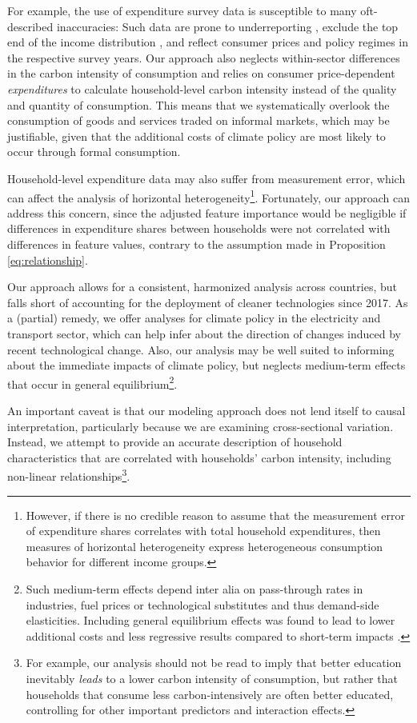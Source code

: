 \documentclass[12pt, a4paper]{article}
\begin{document}
For example, the use of expenditure survey data is susceptible to many oft-described inaccuracies: Such data are prone to underreporting \autocite{Meyer.2015}, exclude the top end of the income distribution \autocite{Blanchet.2022}, and reflect consumer prices and policy regimes in the respective survey years. Our approach also neglects within-sector differences in the carbon intensity of consumption and relies on consumer price-dependent \textit{expenditures} to calculate household-level carbon intensity instead of the quality and quantity of consumption. This means that we systematically overlook the consumption of goods and services traded on informal markets, which may be justifiable, given that the additional costs of climate policy are most likely to occur through formal consumption.

Household-level expenditure data may also suffer from measurement error, which can affect the analysis of horizontal heterogeneity\footnote{However, if there is no credible reason to assume that the measurement error of expenditure shares correlates with total household expenditures, then measures of horizontal heterogeneity express heterogeneous consumption behavior for different income groups.}. Fortunately, our approach can address this concern, since the adjusted feature importance would be negligible if differences in expenditure shares between households were not correlated with differences in feature values, contrary to the assumption made in Proposition \ref{eq:relationship}.

Our approach allows for a consistent, harmonized analysis across countries, but falls short of accounting for the deployment of cleaner technologies since 2017. As a (partial) remedy, we offer analyses for climate policy in the electricity and transport sector, which can help infer about the direction of changes induced by recent technological change. Also, our analysis may be well suited to informing about the immediate impacts of climate policy, but neglects medium-term effects that occur in general equilibrium\footnote{Such medium-term effects depend inter alia on pass-through rates in industries, fuel prices or technological substitutes and thus demand-side elasticities. Including general equilibrium effects was found to lead to lower additional costs and less regressive results compared to short-term impacts \autocite{Ohlendorf.2021,Drupp.2024}.}. 

An important caveat is that our modeling approach does not lend itself to causal interpretation, particularly  because we are examining cross-sectional variation. Instead, we attempt to provide an accurate description of household characteristics that are correlated with households' carbon intensity, including non-linear relationships\footnote{For example, our analysis should not be read to imply that better education inevitably \textit{leads} to a lower carbon intensity of consumption, but rather that households that consume less carbon-intensively are often better educated, controlling for other important predictors and interaction effects.}.
\end{document}
